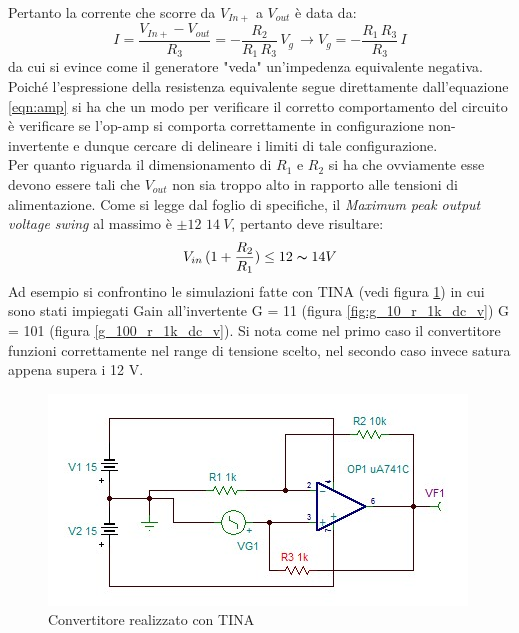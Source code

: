 \documentclass[journal, a4paper]{IEEEtran}
\begin{document}
Pertanto la corrente che scorre da $V_{In+}$ a $V_{out}$ è data da:
\begin{equation}
I = \frac{V_{In+} - V_{out}}{R_3} = -\frac{R_2}{R_1 \, R_3}\, V_g \, \rightarrow V_g = -\frac{R_1\,R_3}{R_3}\,I
\end{equation}
da cui si evince come il generatore "veda" un'impedenza equivalente negativa.\\
Poiché l'espressione della resistenza equivalente segue direttamente dall'equazione \ref{eqn:amp} si ha che un modo per verificare il corretto comportamento del circuito è verificare se l'op-amp si comporta correttamente in configurazione non-invertente e dunque cercare di delineare i limiti di tale configurazione.\\
Per quanto riguarda il dimensionamento di $R_1$ e $R_2$ si ha che ovviamente esse devono essere tali che $V_{out}$ non sia troppo alto in rapporto alle tensioni di alimentazione. Come si legge dal foglio di specifiche, il \textit{Maximum peak output voltage swing} al massimo è $\pm 12$ \textdiv $14~V$, pertanto deve risultare:
\begin{equation}
V_{in}\,(1+\frac{R_2}{R_1}) \leq 12 \thicksim 14 V
\end{equation}
Ad esempio si confrontino le simulazioni fatte con TINA (vedi figura \ref{fig:negimpcon}) in cui sono stati impiegati Gain all'invertente G = 11 (figura \ref{fig:g_10_r_1k_dc_v})  G = 101 (figura \ref{g_100_r_1k_dc_v}). Si nota come nel primo caso il convertitore funzioni correttamente nel range di tensione scelto, nel secondo caso invece satura appena supera i 12 V.
\begin{figure}
\centering
\includegraphics[scale=.6]{negatimpeconv}
\caption{Convertitore realizzato con TINA}
\label{fig:negimpcon}
\end{figure}
\end{document}
